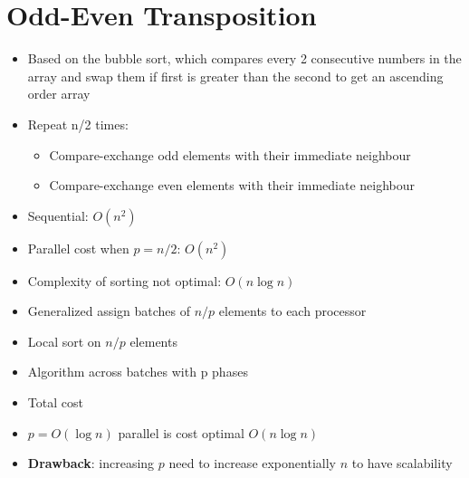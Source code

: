 \documentclass[12pt,oneside]{report}
\begin{document}
\section{Odd-Even Transposition}
\begin{itemize}
    \item Based on the bubble sort, which compares every 2 consecutive numbers in the array and swap them if first is greater than the second to get an ascending order array
    \item Repeat n/2 times:
    \begin{itemize}
        \item Compare-exchange odd elements with their immediate neighbour
        \item Compare-exchange even elements with their immediate neighbour
    \end{itemize}
    \item Sequential: \(O(n^2)\)
    \item Parallel cost when \(p = n/2\): \(O(n^2)\)
    \item Complexity of sorting not optimal: \(O(n \log n)\)
    \item Generalized assign batches of \(n/p\) elements to each processor
    \item Local sort on \(n/p\) elements
    \item Algorithm across batches with p phases
    \item Total cost
    \item \(p=O(\log n)\) parallel is cost optimal \(O(n \log n)\)
    \item \textbf{Drawback}: increasing \(p\) need to increase exponentially \(n\) to have scalability
\end{itemize}
\end{document}
